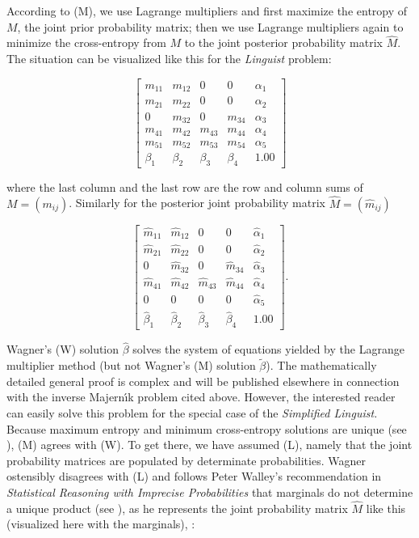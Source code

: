 According to (M), we use Lagrange multipliers and first maximize the
entropy of $M$, the joint prior probability matrix; then we use
Lagrange multipliers again to minimize the cross-entropy from $M$ to
the joint posterior probability matrix $\hat{M}$. The situation can be
visualized like this for the \emph{Linguist} problem:

\begin{equation}
  \label{eq:p5}
      \left[
      \begin{array}{ccccc}
        m_{11} & m_{12} & 0 & 0 & \alpha_{1} \\
        m_{21} & m_{22} & 0 & 0 & \alpha_{2} \\
        0 & m_{32} & 0 & m_{34} & \alpha_{3} \\
        m_{41} & m_{42} & m_{43} & m_{44} & \alpha_{4} \\
        m_{51} & m_{52} & m_{53} & m_{54} & \alpha_{5} \\
        \beta_{1} & \beta_{2} & \beta_{3} & \beta_{4} & 1.00
      \end{array}
\right]
\end{equation}

where the last column and the last row are the row and column sums of
$M=(m_{ij})$. Similarly for the posterior joint probability matrix
$\hat{M}=(\hat{m}_{ij})$

\begin{equation}
  \label{eq:p6}
      \left[
      \begin{array}{ccccc}
        \hat{m}_{11} & \hat{m}_{12} & 0 & 0 & \hat{\alpha}_{1} \\
        \hat{m}_{21} & \hat{m}_{22} & 0 & 0 & \hat{\alpha}_{2} \\
        0 & \hat{m}_{32} & 0 & \hat{m}_{34} & \hat{\alpha}_{3} \\
        \hat{m}_{41} & \hat{m}_{42} & \hat{m}_{43} & \hat{m}_{44} & \hat{\alpha}_{4} \\
        0 & 0 & 0 & 0 & \hat{\alpha}_{5} \\
        \hat{\beta}_{1} & \hat{\beta}_{2} & \hat{\beta}_{3} & \hat{\beta}_{4} & 1.00
      \end{array}
\right].
\end{equation}

Wagner's (W) solution $\hat{\beta}$ solves the system of equations
yielded by the Lagrange multiplier method (but not Wagner's (M)
solution $\tilde{\beta}$). The mathematically detailed general proof
is complex and will be published elsewhere in connection with the
inverse Majern{\'\i}k problem cited above. However, the interested
reader can easily solve this problem for the special case of the
\emph{Simplified Linguist.} Because maximum entropy and minimum
cross-entropy solutions are unique (see ),
(M) agrees with (W). To get there, we have assumed (L), namely that
the joint probability matrices are populated by determinate
probabilities. Wagner ostensibly disagrees with (L) and follows Peter
Walley's recommendation in \emph{Statistical Reasoning with Imprecise
  Probabilities} that marginals do not determine a unique product (see
), as he represents the joint probability
matrix $\hat{M}$ like this (visualized here with the marginals), :

